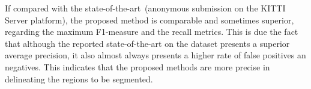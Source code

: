 If compared with the state-of-the-art~(anonymous submission on the KITTI Server platform), the proposed method is comparable and sometimes superior, regarding the maximum F1-measure and the recall metrics. This is due the fact that although the reported state-of-the-art on the dataset presents a superior average precision, it also almost always presents a higher rate of false positives an negatives. This indicates that the proposed methods are more precise in delineating the regions to be segmented.       





